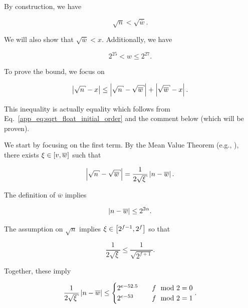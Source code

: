 \noindent
By construction, we have

\begin{equation}
    \sqrt{n} < \sqrt{\overline{w}}.
    \label{app_eq:sqrt_float_initial_order}
\end{equation}

\noindent
We will also show that $\sqrt{\overline{w}} < x$.
Additionally, we have

\begin{equation}
    2^{25} < w \le 2^{27}.
    \label{app_eq:sqrt_float_w_bound}
\end{equation}

To prove the bound, we focus on

\begin{equation}
    \abs{\sqrt{n} - x} \le \abs{\sqrt{n} - \sqrt{\overline{w}}}
                         + \abs{\sqrt{\overline{w}} - x}.
\end{equation}

\noindent
This inequality is actually equality which follows from
Eq.~\eqref{app_eq:sqrt_float_initial_order} and the comment below
(which will be proven).

We start by focusing on the first term.
By the Mean Value Theorem (e.g., \cite[Theorem 5.10]{BabyRudin}),
there exists $\xi\in\left[ v,\overline{w} \right]$
such that

\begin{equation}
    \abs{\sqrt{n} - \sqrt{\overline{w}}}
        = \frac{1}{2\sqrt{\xi}}\abs{n - \overline{w}}.
\end{equation}

\noindent
The definition of $\overline{w}$ implies

\begin{equation}
    \left| n - \overline{w} \right| \le 2^{2\alpha}.
\end{equation}

\noindent
The assumption on $\sqrt{n}$ implies $\xi\in\left[ 2^{f-1},2^{f} \right]$
so that

\begin{equation}
    \frac{1}{2\sqrt{\xi}} \le \frac{1}{\sqrt{2^{f+1}}}.
\end{equation}

\noindent
Together, these imply

\begin{equation}
    \frac{1}{2\sqrt{\xi}}\abs{n - \overline{w}}
        \le \begin{cases}
            2^{e-52.5} &\quad f \mod 2 = 0 \\
            2^{e-53}   &\quad f \mod 2 = 1 \\
    \end{cases}.
\end{equation}

